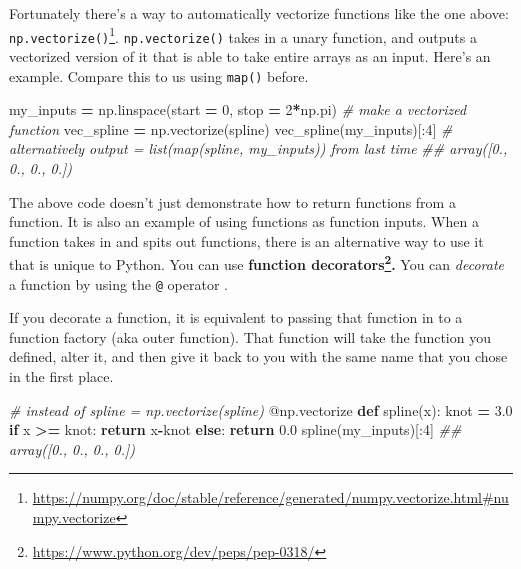 \documentclass[
  12pt,
  krantz2]{krantz}
\makeatletter
\newenvironment{Shaded}{\begin{snugshade}}{\end{snugshade}}
\newcommand{\AttributeTok}[1]{\textcolor[rgb]{0.61,0.61,0.61}{#1}}
\newcommand{\CommentTok}[1]{\textcolor[rgb]{0.37,0.37,0.37}{\textit{#1}}}
\newcommand{\ControlFlowTok}[1]{\textcolor[rgb]{0.27,0.27,0.27}{\textbf{#1}}}
\newcommand{\DecValTok}[1]{\textcolor[rgb]{0.06,0.06,0.06}{#1}}
\newcommand{\FloatTok}[1]{\textcolor[rgb]{0.06,0.06,0.06}{#1}}
\newcommand{\KeywordTok}[1]{\textcolor[rgb]{0.27,0.27,0.27}{\textbf{#1}}}
\newcommand{\NormalTok}[1]{#1}
\newcommand{\OperatorTok}[1]{\textcolor[rgb]{0.43,0.43,0.43}{\textbf{#1}}}
\renewcommand{\href}[2]{#2\footnote{\url{#1}}}
\newenvironment{kframe}{%
\medskip{}
\setlength{\fboxsep}{.8em}
 \def\at@end@of@kframe{}%
 \ifinner\ifhmode%
  \def\at@end@of@kframe{\end{minipage}}%
  \begin{minipage}{\columnwidth}%
 \fi\fi%
 \def\FrameCommand##1{\hskip\@totalleftmargin \hskip-\fboxsep
 \colorbox{shadecolor}{##1}\hskip-\fboxsep
     \hskip-\linewidth \hskip-\@totalleftmargin \hskip\columnwidth}%
 \MakeFramed {\advance\hsize-\width
   \@totalleftmargin\z@ \linewidth\hsize
   \@setminipage}}%
 {\par\unskip\endMakeFramed%
 \at@end@of@kframe}
\renewenvironment{Shaded}{\begin{kframe}}{\end{kframe}}
\makeatother
\begin{document}
Fortunately there's a way to automatically vectorize functions like the one above: \href{https://numpy.org/doc/stable/reference/generated/numpy.vectorize.html\#numpy.vectorize}{\texttt{np.vectorize()}}. \texttt{np.vectorize()} takes in a unary function, and outputs a vectorized version of it that is able to take entire arrays as an input. Here's an example. Compare this to us using \texttt{map()} before.

\begin{Shaded}
\begin{Highlighting}[]
\NormalTok{my\_inputs }\OperatorTok{=}\NormalTok{ np.linspace(start }\OperatorTok{=} \DecValTok{0}\NormalTok{, stop }\OperatorTok{=} \DecValTok{2}\OperatorTok{*}\NormalTok{np.pi)}
\CommentTok{\# make a vectorized function}
\NormalTok{vec\_spline }\OperatorTok{=}\NormalTok{ np.vectorize(spline) }
\NormalTok{vec\_spline(my\_inputs)[:}\DecValTok{4}\NormalTok{]}
\CommentTok{\# alternatively output = list(map(spline, my\_inputs)) from last time}
\CommentTok{\#\# array([0., 0., 0., 0.])}
\end{Highlighting}
\end{Shaded}

The above code doesn't just demonstrate how to return functions from a function. It is also an example of using functions as function inputs. When a function takes in and spits out functions, there is an alternative way to use it that is unique to Python. You can use \textbf{\href{https://www.python.org/dev/peps/pep-0318/}{function decorators}.} You can \emph{decorate} a function by using the \texttt{@} operator \citep{Lutz13}.

If you decorate a function, it is equivalent to passing that function in to a function factory (aka outer function). That function will take the function you defined, alter it, and then give it back to you with the same name that you chose in the first place.

\begin{Shaded}
\begin{Highlighting}[]
\CommentTok{\# instead of spline = np.vectorize(spline) }
\AttributeTok{@np.vectorize}
\KeywordTok{def}\NormalTok{ spline(x):}
\NormalTok{    knot }\OperatorTok{=} \FloatTok{3.0}
    \ControlFlowTok{if}\NormalTok{ x }\OperatorTok{\textgreater{}=}\NormalTok{ knot:}
        \ControlFlowTok{return}\NormalTok{ x}\OperatorTok{{-}}\NormalTok{knot}
    \ControlFlowTok{else}\NormalTok{:}
        \ControlFlowTok{return} \FloatTok{0.0}
\NormalTok{spline(my\_inputs)[:}\DecValTok{4}\NormalTok{]}
\CommentTok{\#\# array([0., 0., 0., 0.])}
\end{Highlighting}
\end{Shaded}
\end{document}

